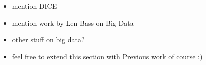 \begin{itemize}
\item mention DICE
\item mention work by Len Bass on Big-Data
\item other stuff on big data?
\item feel free to extend this section with Previous work of course :)
\end{itemize}